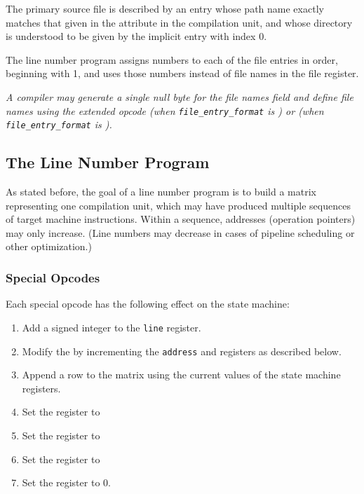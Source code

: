 \begin{enumerate}[1. ]
The primary source file is described by an entry whose path
name exactly matches that given in the \DWATname{} attribute
in the compilation unit, and whose directory is understood
to be given by the implicit entry with index 0.

The line number program assigns numbers to each of the file
entries in order, beginning with 1, and uses those numbers
instead of file names in the file register.

\textit{A compiler may generate a single null byte for the file
names field and define file names using the extended opcode
\DWLNEdefinefile{} (when \texttt{file\_entry\_format} is \DWLNFtimestampsize) or
\DWLNEdefinefileMDfive{} (when \texttt{file\_entry\_format} is \DWLNFMDfive).}


\end{enumerate}

\subsection{The Line Number Program}

As stated before, the goal of a line number program is to build
a matrix representing one compilation unit, which may have
produced multiple sequences of target machine instructions.
Within a sequence, addresses 
(operation pointers) may only
increase. (Line numbers may decrease in cases of pipeline
scheduling or other optimization.)

\subsubsection{Special Opcodes} 
\label{chap:specialopcodes}
Each  special opcode has the following effect on the state machine:

\begin{enumerate}[1. ]

\item  Add a signed integer to the \texttt{line} register.

\item  Modify the  by incrementing the
\texttt{address} and  registers as described below.

\item  Append a row to the matrix using the current values
of the state machine registers.

\item  Set the  register to  
\item  Set the  register to 
\item  Set the  register to 
\item  Set the  register to 0.

\end{enumerate}

